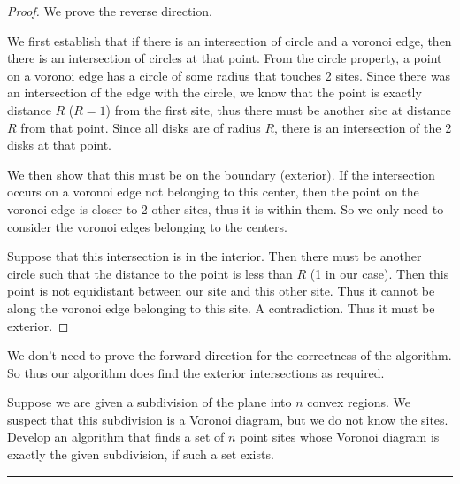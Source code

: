 \documentclass[11pt]{article}
\begin{document}
\begin{proof}
    We prove the reverse direction. 

    We first establish that if there is an intersection of circle and a voronoi edge,
    then there is an intersection of circles at that point. From the circle property,
    a point on a voronoi edge has a circle of some radius that touches 2 sites.
    Since there was an intersection of the edge with the circle, we know that the point is 
    exactly distance $R$ ($R=1$) from the first site, thus there must be another site at distance $R$
    from that point. Since all disks are of radius $R$, there is an intersection of the 2 disks at that point.

    We then show that this must be on the boundary (exterior). If the intersection occurs on a voronoi
    edge not belonging to this center, then the point on the voronoi edge is closer to 2 other sites,
    thus it is within them. So we only need to consider the voronoi edges belonging to the centers.

    Suppose that this intersection is in the interior. Then there must be another circle such that 
    the distance to the point is less than $R$ (1 in our case). 
    Then this point is not equidistant between our site and this other site. Thus it cannot be along the
    voronoi edge belonging to this site. A contradiction. Thus it must be exterior.
\end{proof}

We don't need to prove the forward direction for the correctness of the algorithm. 
So thus our algorithm does find the exterior intersections as required. 





Suppose we are given a subdivision of the plane into $n$ convex regions. We
suspect that this subdivision is a Voronoi diagram, but we do not know the
sites. Develop an algorithm that finds a set of $n$ point sites whose Voronoi
diagram is exactly the given subdivision, if such a set exists.
\hrule
\end{document}
